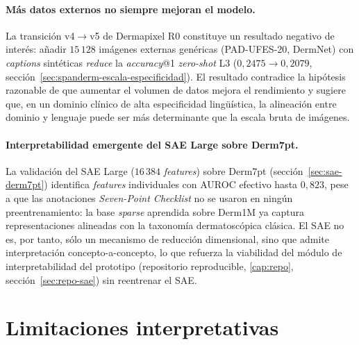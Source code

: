 \paragraph{Más datos externos no siempre mejoran el modelo.}
La transición v4$\to$v5 de Dermapixel R0 constituye un resultado negativo
de interés: añadir $15\,128$ imágenes externas genéricas
(PAD-UFES-20, DermNet) con \emph{captions} sintéticas \emph{reduce} la
\emph{accuracy}@1 \emph{zero-shot} L3 ($0{,}2475 \to 0{,}2079$,
sección~\ref{sec:spanderm-escala-especificidad}). El resultado contradice
la hipótesis razonable de que aumentar el volumen de datos mejora el
rendimiento y sugiere que, en un dominio clínico de alta especificidad
lingüística, la alineación entre dominio y lenguaje puede ser más
determinante que la escala bruta de imágenes.

\paragraph{Interpretabilidad emergente del SAE Large sobre
Derm7pt.}
La validación del SAE Large ($16\,384$ \emph{features}) sobre Derm7pt
(sección~\ref{sec:sae-derm7pt}) identifica \emph{features} individuales
con AUROC efectivo hasta $0{,}823$, pese a que las anotaciones
\emph{Seven-Point Checklist} no se usaron en ningún preentrenamiento:
la base \emph{sparse} aprendida sobre Derm1M ya captura representaciones
alineadas con la taxonomía dermatoscópica clásica. El SAE no es, por
tanto, sólo un mecanismo de reducción dimensional, sino que admite
interpretación concepto-a-concepto, lo que refuerza la viabilidad del
módulo de interpretabilidad del prototipo (repositorio reproducible,
\ref{cap:repo}, sección~\ref{sec:repo-sae}) sin reentrenar el SAE.

\section{Limitaciones interpretativas}
\label{sec:disc-limitaciones}

